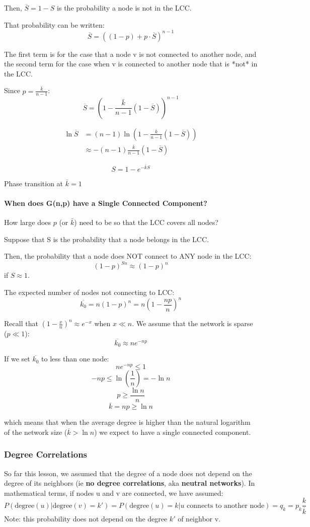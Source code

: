 \documentclass[11pt]{scrartcl} %
\begin{document}
Then, $\overline{S} = 1-S$ is the probability a node is not in the LCC.

That probability can be written: 
\[ \overline{S} = ((1-p) + p \cdot \overline{S})^{n-1} \]

The first term is for the case that a node v is not connected to another node, and the second term for the case when v is connected to another node that is *not* in the LCC.

Since $p=\frac{\bar{k}}{n-1}$:
\[ \overline{S} = (1- \frac{\bar{k}}{n-1} (1 - \overline{S}))^{n-1} \]

\begin{align*}
\ln \overline{S} & = (n-1) \ln(1-\frac{\bar{k}}{n-1} (1-\overline{S}))\\
	& \approx -(n-1) \frac{\bar{k}}{n-1} (1-\overline{S})
\end{align*}

\[ S = 1 - e^{-\bar{k} S}\]

Phase transition at $\bar{k} = 1$


\paragraph{When does G(n,p) have a Single Connected Component?}
How large does $p$ (or $\bar{k}$) need to be so that the LCC covers all nodes?

Suppose that S is the probability that a node belongs in the LCC. 

Then, the probability that a node does NOT connect to ANY node in the LCC:
\[ (1-p)^{Sn} \approx (1-p)^n \]
if  $S \approx 1$.

The expected number of nodes not connecting to LCC:
\[ \overline{k_0} = n (1-p)^n = n(1 - \frac{np}{n})^n \]

Recall that $(1-\frac{x}{n})^{n} \approx e^{-x}$ when $x \ll n$. We assume that the network is sparse ($p \ll 1$): 
\[ \overline{k_0} \approx ne^{-np}\]

If we set $\overline{k_0}$ to less than one node:
\[ ne^{-np} \leq 1\]
\[ -np \leq \ln(\frac{1}{n}) = -\ln n \]
\[p \geq \frac{\ln n}{n}\]
\[\overline{k} = np \geq \ln n\]

which means that when the average degree is higher than the natural logarithm of the network size ($\overline{k} > \ln n$) we expect to have a single connected component.

\subsubsection{Degree Correlations}
So far this lesson, we assumed that the degree of a node does not depend on the degree of its neighbors (ie \textbf{no degree correlations}, aka \textbf{neutral networks}). In mathematical terms, if nodes u and v are connected, we have assumed: 
\[P(\text{degree}(u)|\text{degree}(v)=k') = P(\text{degree}(u)=k|u \text{ connects to another node}) = q_k = p_k \frac{k}{\overline{k}}\]
Note: this probability does not depend on the degree $k'$ of neighbor v.
\end{document}
